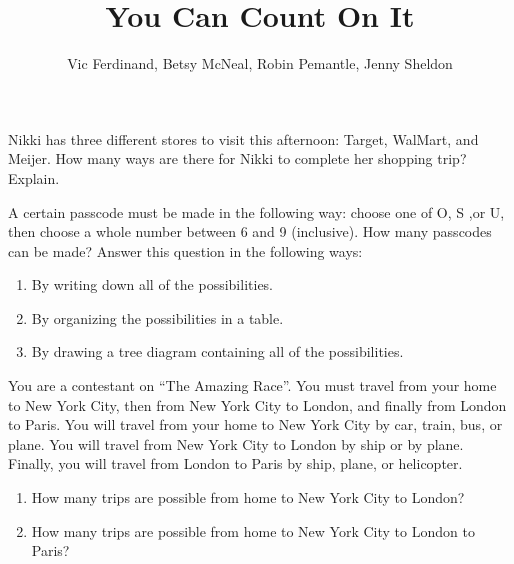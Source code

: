 \documentclass{ximera}
\title{You Can Count On It}
\author{Vic Ferdinand, Betsy McNeal, Robin Pemantle, Jenny Sheldon}
\begin{document}
\begin{abstract}
\end{abstract}
\maketitle



\begin{problem}
Nikki has three different stores to visit this afternoon: Target, WalMart, and Meijer.  How many ways are there for Nikki to complete her shopping trip?  Explain.
\end{problem}





\begin{problem}
A certain passcode must be made in the following way: choose one of O, S ,or U, then choose a whole number between 6 and 9 (inclusive).  How many passcodes can be made?  Answer this question in the following ways:
\begin{enumerate}
\item By writing down all of the possibilities.
\item By organizing the possibilities in a table.
\item By drawing a tree diagram containing all of the possibilities.
\end{enumerate}
\end{problem}

\begin{problem}
You are a contestant on ``The Amazing Race''.  You must travel from your home to New York City, then from New York City to London, and finally from London to Paris.  You will travel from your home to New York City by car, train, bus, or plane.  You will travel from New York City to London by ship or by plane.  Finally, you will travel from London to Paris by ship, plane, or helicopter.
\begin{enumerate}
\item How many trips are possible from home to New York City to London?
\item How many trips are possible from home to New York City to London to Paris?
\end{enumerate}
\end{problem}
\end{document}
